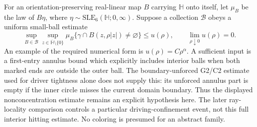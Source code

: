 \documentclass[11pt]{article}
\theoremstyle{definition}\newtheorem{definition}[theorem]{Definition}
\theoremstyle{remark}\newtheorem{remark}[theorem]{Remark}
\begin{document}
For an orientation-preserving real-linear map $B$ carrying $\mathbb H$
onto itself, let $\mu_B$ be the law of $B\eta$, where
$\eta\sim\mathrm{SLE}_6(\mathbb H;0,\infty)$. Suppose a collection
$\mathcal B$ obeys a uniform small-ball estimate
\begin{equation}
 \sup_{B\in\mathcal B}\sup_{z\in\overline{\mathbb H}\setminus\{0\}}
 \mu_B\{\gamma\cap B(z,\rho|z|)\ne\varnothing\}
 \leq u(\rho),\qquad \lim_{\rho\downarrow0}u(\rho)=0.
 \label{eq:metric-nonconcentration}
\end{equation}
An example of the required numerical form is $u(\rho)=C\rho^\alpha$.
A sufficient input is a first-entry annulus bound which explicitly
includes interior balls when both marked ends are outside the outer ball.
The boundary-unforced G2/C2 estimate used for driver tightness alone does
not supply this: its unforced annulus part is empty if the inner circle
misses the current domain boundary. Thus the displayed nonconcentration
estimate remains an explicit hypothesis here. The later ray-locality
comparison controls a particular driving-confinement event, not this full
interior hitting estimate. No coloring is presumed for an abstract family.
\end{document}
